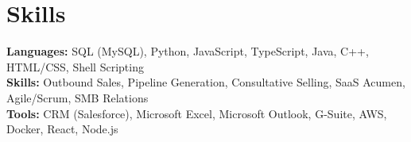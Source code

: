 \documentclass[11pt]{article}       %
\begin{document}
\vspace{-18.5pt}

\section*{Skills}
\textbf{Languages:} SQL (MySQL), Python, JavaScript, TypeScript, Java, C++, HTML/CSS, Shell Scripting\\
\textbf{Skills:} Outbound Sales, Pipeline Generation, Consultative Selling, SaaS Acumen, Agile/Scrum, SMB Relations\\
\textbf{Tools:} CRM (Salesforce), Microsoft Excel, Microsoft Outlook, G-Suite, AWS, Docker, React, Node.js\\

\vspace{-6.5pt}
\end{document}
